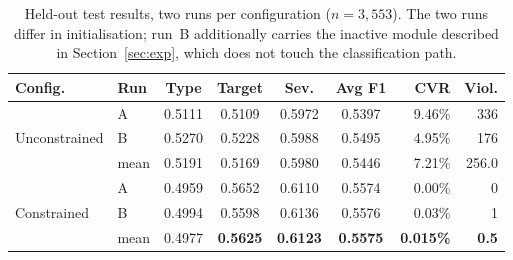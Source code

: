 \documentclass[conference]{IEEEtran}
\begin{document}
\begin{table}[t]
\caption{Held-out test results, two runs per configuration ($n = 3{,}553$).
The two runs differ in initialisation; run~B additionally carries the
inactive module described in Section~\ref{sec:exp}, which does not touch the
classification path.}
\label{tab:ablation}
\centering
\footnotesize
\setlength{\tabcolsep}{3.4pt}
\begin{tabular}{llccccrr}
\toprule
\textbf{Config.} & \textbf{Run} & \textbf{Type} & \textbf{Target} & \textbf{Sev.} & \textbf{Avg F1} & \textbf{CVR} & \textbf{Viol.} \\
\midrule
\multirow{3}{*}{Unconstrained}
 & A & 0.5111 & 0.5109 & 0.5972 & 0.5397 & 9.46\% & 336 \\
 & B & 0.5270 & 0.5228 & 0.5988 & 0.5495 & 4.95\% & 176 \\
 & mean & 0.5191 & 0.5169 & 0.5980 & 0.5446 & 7.21\% & 256.0 \\
\midrule
\multirow{3}{*}{Constrained}
 & A & 0.4959 & 0.5652 & 0.6110 & 0.5574 & 0.00\% & 0 \\
 & B & 0.4994 & 0.5598 & 0.6136 & 0.5576 & 0.03\% & 1 \\
 & mean & 0.4977 & \textbf{0.5625} & \textbf{0.6123} & \textbf{0.5575} & \textbf{0.015\%} & \textbf{0.5} \\
\bottomrule
\end{tabular}
\end{table}
\end{document}
